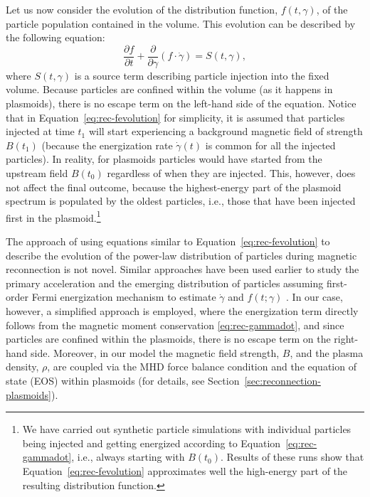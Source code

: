Let us now consider the evolution of the distribution function, $f(t,\gamma)$, of the particle population contained in the volume. This evolution can be described by the following equation:
\begin{equation}
    \label{eq:rec-fevolution}
    \frac{\partial f}{\partial t} + \frac{\partial}{\partial \gamma}\left(f\cdot \dot{\gamma}\right)=S(t,\gamma),
\end{equation}
where $S(t,\gamma)$ is a source term describing particle injection into the fixed volume. Because particles are confined within the volume (as it happens in plasmoids), there is no escape term on the left-hand side of the equation. Notice that in Equation~\eqref{eq:rec-fevolution} for simplicity, it is assumed that particles injected at time $t_1$ will start experiencing a background magnetic field of strength $B(t_1)$ (because the energization rate $\dot{\gamma}(t)$ is common for all the injected particles). In reality, for plasmoids particles would have started from the upstream field $B(t_0)$ regardless of when they are injected. This, however, does not affect the final outcome, because the highest-energy part of the plasmoid spectrum is populated by the oldest particles, i.e., those that have been injected first in the plasmoid.\footnote{We have carried out synthetic particle simulations with individual particles being injected and getting energized according to Equation~\eqref{eq:rec-gammadot}, i.e., always starting with $B(t_0)$. Results of these runs show that Equation~\eqref{eq:rec-fevolution} approximates well the high-energy part of the resulting distribution function.}

The approach of using equations similar to Equation~\eqref{eq:rec-fevolution} to describe the evolution of the power-law distribution of particles during magnetic reconnection is not novel. Similar approaches have been used earlier to study the primary acceleration and the emerging distribution of particles assuming first-order Fermi energization mechanism to estimate $\dot{\gamma}$ and $f(t;\gamma)$ \citep[see, e.g.,][]{2012MNRAS.422.2474D, 2014PhRvL.113o5005G, 2017PhPl...24f2906M, 2019ApJ...879L..23G}. In our case, however, a simplified approach is employed, where the energization term directly follows from the magnetic moment conservation \eqref{eq:rec-gammadot}, and since particles are confined within the plasmoids, there is no escape term on the right-hand side. Moreover, in our model the magnetic field strength, $B$, and the plasma density, $\rho$,  are coupled via the MHD force balance condition and the equation of state (EOS) within plasmoids (for details, see Section~\ref{sec:reconnection-plasmoids}).

